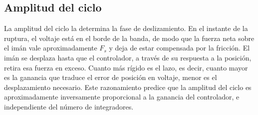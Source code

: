 \subsection{Amplitud del ciclo}

La amplitud del ciclo la determina la fase de deslizamiento. En el instante de la ruptura, el voltaje está en el borde de la banda, de modo que la fuerza neta sobre el imán vale aproximadamente $F_s$ y deja de estar compensada por la fricción. El imán se desplaza hasta que el controlador, a través de su respuesta a la posición, retira esa fuerza en exceso. Cuanto más rígido es el lazo, es decir, cuanto mayor es la ganancia que traduce el error de posición en voltaje, menor es el desplazamiento necesario. Este razonamiento predice que la amplitud del ciclo es aproximadamente inversamente proporcional a la ganancia del controlador, e independiente del número de integradores.

